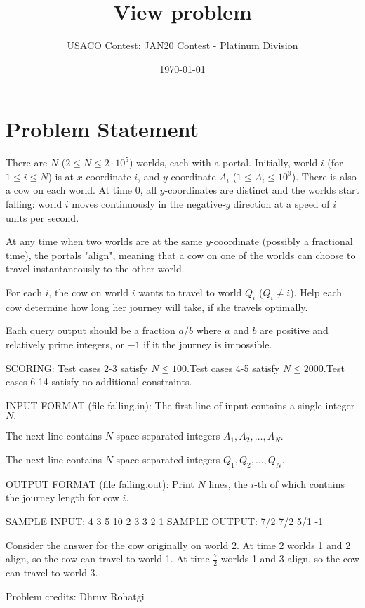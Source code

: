 \documentclass[12pt]{article}
\title{View problem}
\author{USACO Contest: JAN20 Contest - Platinum Division}
\date{\today}
\begin{document}
\maketitle

\section*{Problem Statement}

There are $N$ ($2\le N\le 2\cdot 10^5$) worlds, each with a portal. Initially,
world $i$ (for $1 \leq i \leq N$) is at $x$-coordinate $i$, and $y$-coordinate
$A_i$ ($1\le A_i\le 10^9$). There is also a cow on each world. At time $0$, all
$y$-coordinates are distinct and the worlds start falling: world $i$ moves
continuously in the negative-$y$ direction at a speed of $i$ units per second. 

At any time when two worlds are at the same $y$-coordinate (possibly a
fractional time), the portals "align", meaning that a cow on one of the worlds
can choose to travel instantaneously to the other world.

For each $i$, the cow on world $i$ wants to travel to world $Q_i$ ($Q_i\neq i$).
Help each cow determine how long her journey will take, if she travels
optimally.

Each query output should be a fraction $a/b$ where $a$ and $b$ are positive and
relatively prime integers, or $-1$ if it the journey is impossible.

SCORING:
Test cases 2-3 satisfy $N\le 100.$Test cases 4-5 satisfy $N\le 2000.$Test cases 6-14 satisfy no additional constraints.

INPUT FORMAT (file falling.in):
The first line of input contains a single integer $N.$

The next line contains $N$ space-separated integers $A_1,A_2,\ldots,A_N.$

The next line contains $N$ space-separated integers $Q_1,Q_2,\ldots,Q_N.$

OUTPUT FORMAT (file falling.out):
Print $N$ lines, the $i$-th of which contains the journey length for cow $i.$

SAMPLE INPUT:
4
3 5 10 2
3 3 2 1
SAMPLE OUTPUT: 
7/2
7/2
5/1
-1

Consider the answer for the cow originally on world 2. At time $2$ worlds 1 and
2 align, so the cow can travel to world 1. At time $\frac{7}{2}$ worlds 1 and 3
align, so the cow can  travel to world 3.


Problem credits: Dhruv Rohatgi
\end{document}
